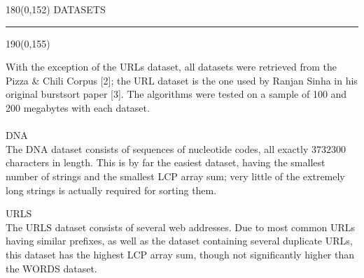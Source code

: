 %

\begin{textblock}{180}(0,152)
\sffamily\normalsize{\color{sciorange}DATASETS}\small\\
\rule[3mm]{190mm}{0.1pt}
\end{textblock} 
\begin{textblock}{190}(0,155)
 \footnotesize 
\begin{multicols}{3}
With the exception of the URLs dataset, all datasets were retrieved from
the Pizza \& Chili Corpus [2]; the URL dataset is the one used by Ranjan Sinha
in his original burstsort paper [3]. The algorithms were tested on a sample
of 100 and 200 megabytes with each dataset.\\\\
\sffamily\normalsize{\color{sciorange}DNA}\small\\
\footnotesize 
The DNA dataset consists of sequences of nucleotide codes, all exactly $3732300$
characters in length.  This is by far the easiest dataset, having the smallest
number of strings and the smallest LCP array sum; very little of the extremely
long strings is actually required for sorting them.

\sffamily\normalsize{\color{sciorange}URLS}\small\\
\footnotesize 
The URLS dataset consists of several web addresses.  Due to most common URLs
having similar prefixes, as well as the dataset containing several duplicate
URLs, this dataset has the highest LCP array sum, though not significantly
higher than the WORDS dataset.



\end{multicols}

\end{textblock} 

